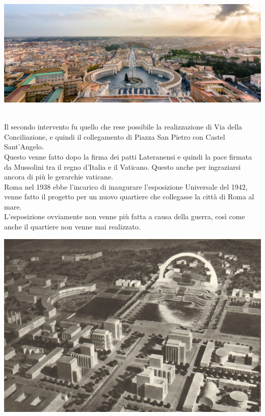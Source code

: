 \documentclass[a4paper,12pt, oneside]{book}
\begin{document}
  \begin{center}
  	\includegraphics[width=0.6\linewidth]{"immagini/via della conciliazione"}
  	\label{fig:via della conciliazione}
  \end{center}
  \leavevmode\\
  Il secondo intervento fu quello che rese possibile la realizzazione di Via della Conciliazione, e quindi il collegamento di Piazza San Pietro con Castel Sant'Angelo.\\
  Questo venne fatto dopo la firma dei patti Lateranensi e quindi la pace firmata da Mussolini tra il regno d'Italia e il Vaticano. Questo anche per ingraziarsi ancora di più le gerarchie vaticane.\\
  Roma nel 1938 ebbe l'incarico di inaugurare l'esposizione Universale del 1942, venne fatto il progetto per un nuovo quartiere che collegasse la città di Roma al mare.\\
  L'esposizione ovviamente non venne più fatta a causa della guerra, così come anche il quartiere non venne mai realizzato.\\
  \begin{center}
  	\includegraphics[width=0.6\linewidth]{"immagini/esposizione universale di roma"}
  	\label{fig:esposizione universale di roma}
  \end{center}
  \leavevmode\\   
\end{document}

